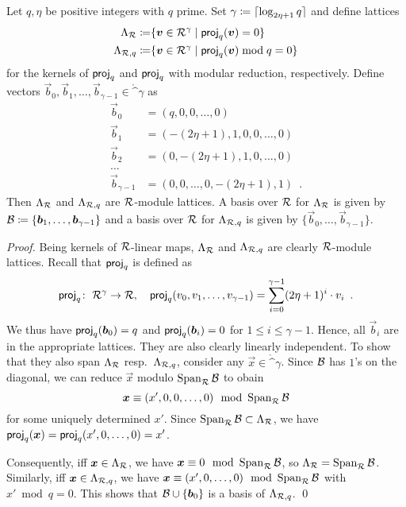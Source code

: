 \begin{proposition}\label{prop:kernellattices}
Let $q,\eta$ be positive integers with $q$ prime. Set $\gamma \coloneqq \lceil \log_{2\eta+1}q\rceil$ and define lattices
\begin{align*}
\Lambda_{\mathcal{R}}    \coloneqq &\{\boldsymbol{v}\in\mathcal{R}^\gamma \mid \mathsf{proj}_q(\boldsymbol{v}) = 0\}\\
\Lambda_{\mathcal{R},q} \coloneqq &\{\boldsymbol{v}\in\mathcal{R}^\gamma \mid \mathsf{proj}_q(\boldsymbol{v}) \bmod q= 0\}\\
\end{align*}
for the kernels of $\mathsf{proj}_q$ and $\mathsf{proj}_q$ with modular reduction, respectively.
Define vectors $\vec{b}_0,\vec{b}_1,\ldots,\vec{b}_{\gamma-1} \in \ring^\gamma$ as
\begin{align*}
\vec{b}_0 &= (q,0,0,\ldots, 0)\\
\vec{b}_1 &= (-(2\eta+1), 1, 0,0,\ldots, 0)\\
\vec{b}_2 &= (0, -(2\eta+1), 1, 0,\ldots, 0)\\
\ldots\\
\vec{b}_{\gamma-1}&=(0,0,\ldots,0, -(2\eta+1), 1)\enspace.
\end{align*}
Then $\Lambda_{\mathcal{R}}$ and $\Lambda_{\mathcal{R},q}$ are $\mathcal{R}$-module lattices. A basis over $\mathcal{R}$ for $\Lambda_{\mathcal{R}}$ is given by $\mathcal{B} \coloneqq \{\boldsymbol{b}_1,\ldots,\boldsymbol{b}_{\gamma-1}\}$ and
a basis over $\mathcal{R}$ for $\Lambda_{\mathcal{R},q}$ is given by $\{\vec{b}_0,\ldots,\vec{b}_{\gamma-1}\}$.
\end{proposition}
\begin{proof}
Being kernels of $\mathcal{R}$-linear maps, $\Lambda_{\mathcal{R}}$ and $\Lambda_{\mathcal{R},q}$ are clearly $\mathcal{R}$-module lattices. Recall that $\mathsf{proj}_q$ is defined as
\[
\mathsf{proj}_q\colon\;\mathcal{R}^\gamma\to\mathcal{R}, \quad \mathsf{proj}_q(v_0,v_1,\ldots, v_{\gamma-1}) = \sum_{i=0}^{\gamma-1} (2\eta+1)^i \cdot v_i\enspace.
\]
We thus have $\mathsf{proj}_q(\boldsymbol{b}_0) = q$ and $\mathsf{proj}_q(\boldsymbol{b}_i) = 0$ for $1\leq i \leq \gamma-1$.
Hence, all $\vec{b}_i$ are in the appropriate lattices.
They are also clearly linearly independent.
To show that they also span $\Lambda_{\mathcal{R}}$ resp.\ $\Lambda_{\mathcal{R},q}$, consider any $\vec{x}\in\ring^\gamma$.
Since $\mathcal{B}$ has $1$'s on the diagonal, we can reduce $\vec{x}$ modulo $\operatorname*{Span}_{\mathcal{R}} \mathcal{B}$ to obain
\[
  \boldsymbol{x}\equiv (x',0,0,\ldots, 0) \mod {\operatorname*{Span}}\nolimits_{\mathcal{R}}\mathcal{B}
\]
for some uniquely determined $x'$. Since $\operatorname*{Span}_{\mathcal{R}}\mathcal{B}\subset \Lambda_{\mathcal{R}}$, we have $\mathsf{proj}_q(\boldsymbol{x}) = \mathsf{proj}_q(x',0,\ldots, 0) = x'$.

Consequently, iff $\boldsymbol{x}\in\Lambda_{\mathcal{R}}$, we have $\boldsymbol{x}\equiv 0 \mod {\operatorname*{Span}}_{\mathcal{R}}\mathcal{B}$, so $\Lambda_{\mathcal{R}} = \operatorname*{Span}_{\mathcal{R}}\mathcal{B}$.
Similarly, iff $\boldsymbol{x}\in\Lambda_{\mathcal{R},q}$, we have $\boldsymbol{x}\equiv (x',0,\ldots, 0) \mod {\operatorname*{Span}}_{\mathcal{R}}\mathcal{B}$ with $x'\bmod q = 0$. This shows that $\mathcal{B}\cup\{\boldsymbol{b}_0\}$ is a basis of $\Lambda_{\mathcal{R},q}$.
\qed
\end{proof}
